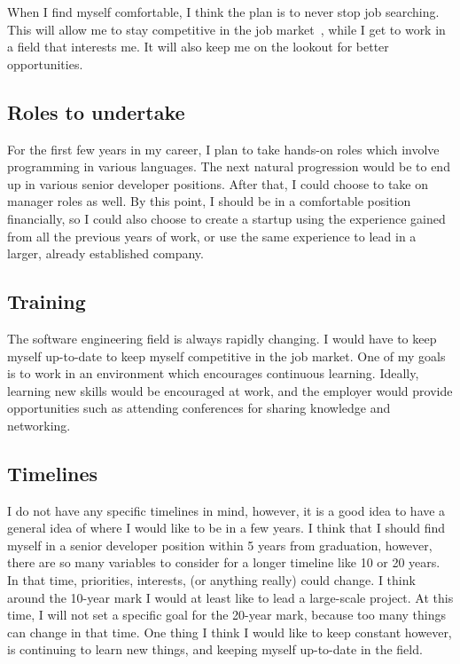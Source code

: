 When I find myself comfortable, I think the plan is to never stop job searching.
This will allow me to stay competitive in the job market~\cite{kleiman_2015},
while I get to work in a field that interests me. It will also keep me on the
lookout for better opportunities.


\subsection{Roles to undertake}
For the first few years in my career, I plan to take hands-on roles which
involve programming in various languages. The next natural progression would be
to end up in various senior developer positions. After that, I could choose to
take on manager roles as well. By this point, I should be in a comfortable
position financially, so I could also choose to create a startup using the
experience gained from all the previous years of work, or use the same
experience to lead in a larger, already established company.

\subsection{Training}
The software engineering field is always rapidly changing. I would have to keep
myself up-to-date to keep myself competitive in the job market. One of my goals
is to work in an environment which encourages continuous learning. Ideally,
learning new skills would be encouraged at work, and the employer would provide
opportunities such as attending conferences for sharing knowledge and
networking. 

\subsection{Timelines}
I do not have any specific timelines in mind, however, it is a good idea to have
a general idea of where I would like to be in a few years. I think that I
should find myself in a senior developer position within 5 years from
graduation, however, there are so many variables to consider for a longer
timeline like 10 or 20 years. In that time, priorities, interests, (or anything
really) could change. I think around the 10-year mark I would at least like to
lead a large-scale project. At this time, I will not set a specific goal for the
20-year mark, because too many things can change in that time. One thing I think
I would like to keep constant however, is continuing to learn new things, and
keeping myself up-to-date in the field. 

